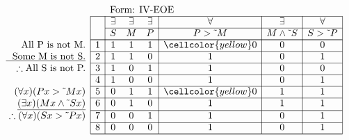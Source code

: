 \documentclass[10pt,legalpaper,landscape,cmtt]{article}
\begin{document}
{\begin{minipage}[t]{3.25in}
	\(
	\begin{array}{r|c|ccc|c|c|c|}
		\multicolumn{2}{c}{}&\multicolumn{6}{l}{\mbox{Form: IV-EOE}} \\ \cline{2-8}
		\hspace{1in}	&	& \exists & \exists & \exists & \forall & \exists & \forall\\ \cline{3-8}
		&	& S & M & P &  P > \tilde~M  &  M \wedge \tilde~S  &  S > \tilde~P \\ \cline{2-8} \cline{2-8}
		\phantom{\therefore}\mbox{All P is not M.}   & 1 & 1 & 1 & 1 &   \cellcolor{yellow} 0   &   0   &   0  \\ \cline{2-8}
		\underline{\phantom{\therefore}\mbox{Some M is not S.}}   & 2 & 1 & 1 & 0 &   1   &   0   &   1  \\ \cline{2-8}
		\therefore \mbox{All S is not P.}   & 3 & 1 & 0 & 1 &   1   &   0   &   0  \\ \cline{2-8}
		& 4 & 1 & 0 & 0 &   1   &   0   &   1  \\ \cline{2-8}
		(\forall x)(Px > \tilde~Mx)   & 5 & 0 & 1 & 1 &   \cellcolor{yellow} 0   &   1   &   1  \\ \cline{2-8}
		\underline{(\exists x)(Mx \wedge \tilde~Sx)}   & 6 & 0 & 1 & 0 &   1   &   1   &   1  \\ \cline{2-8}
		\therefore(\forall x)(Sx > \tilde~Px)   & 7 & 0 & 0 & 1 &   1   &   0   &   1  \\ \cline{2-8}
		& 8 & 0 & 0 & 0 &   1   &   0   &   1   \\ \cline{2-8}\cline{2-8} 
	\end{array}
	\)
\end{minipage}

}
\end{document}
